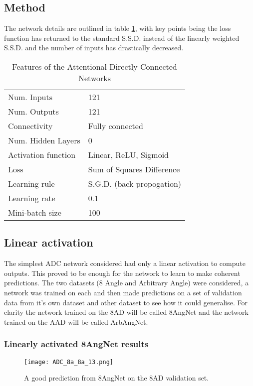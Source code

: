 \subsection{Method}
The network details are outlined in table \ref{tb:attnet1def}, with key points being the loss function has returned to the standard S.S.D. instead of the linearly weighted S.S.D. and the number of inputs has drastically decreased. 

\begin{table}[h]
\centering
\begin{tabular}{ | l | l | }
    \hline
    Num. Inputs & 121 \\
    Num. Outputs & 121 \\
    Connectivity & Fully connected \\
    Num. Hidden Layers & 0 \\
    Activation function & Linear, ReLU, Sigmoid \\
    Loss & Sum of Squares Difference \\
    Learning rule & S.G.D. (back propogation) \\
    Learning rate & 0.1 \\
    Mini-batch size & 100 \\
    \hline
\end{tabular}
\caption{Features of the Attentional Directly Connected Networks}
\label{tb:attnet1def}
\end{table}

\subsection{Linear activation}
The simplest ADC network considered had only a linear activation to compute outputs. 
This proved to be enough for the network to learn to make coherent predictions. 
The two datasets (8 Angle and Arbitrary Angle) were considered, a network was trained on each and then made predictions on a set of validation data from it's own dataset and other dataset to see how it could generalise.
For clarity the network trained on the 8AD will be called 8AngNet and the network trained on the AAD will be called ArbAngNet. 

\subsubsection{Linearly activated 8AngNet results}

\begin{figure}
    \centering
    \texttt{[image: ADC\_8a\_8a\_13.png]}
    \caption{A good prediction from 8AngNet on the 8AD validation set.}
    \label{fig:ADC_8a_8a_crct} 
\end{figure}

